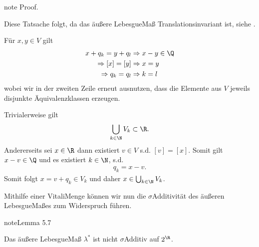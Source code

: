 \documentclass[letterpaper,10pt,english]{jupyterBook}
\begin{document}
\begin{sphinxadmonition}{note}
\sphinxAtStartPar
Proof. 

\sphinxAtStartPar
{}

\sphinxAtStartPar
Diese Tatsache folgt, da das äußere Lebesgue\sphinxhyphen{}Maß Translationsinvariant ist, siehe {\hyperref[\detokenize{masstheorie/masstheorie:rem:transinvariance}]{}}.

\sphinxAtStartPar
{}

\sphinxAtStartPar
Für \(x,y\in V\) gilt
\begin{equation*}
\begin{split}x + q_k = y + q_l&\Rightarrow x-y\in\Q\\
\Rightarrow [x]=[y]&\Rightarrow x=y\\
\Rightarrow q_k=q_l&\Rightarrow k=l\end{split}
\end{equation*}
\sphinxAtStartPar
wobei wir in der zweiten Zeile erneut ausnutzen, dass die Elemente aus \(V\) jeweils disjunkte Äquivalenzklassen erzeugen.

\sphinxAtStartPar
{}

\sphinxAtStartPar
Trivialerweise gilt
\begin{equation*}
\begin{split}\bigcup_{k\in\N} V_k \subset \R.\end{split}
\end{equation*}
\sphinxAtStartPar
Andererseits sei \(x\in\R\) dann existiert \(v\in V\) s.d. \([v] = [x]\). Somit gilt \(x-v\in\Q\) und es existiert \(k\in\N\), s.d.
\begin{equation*}
\begin{split}q_k = x-v.\end{split}
\end{equation*}
\sphinxAtStartPar
Somit folgt \(x=v+q_k\in V_k\) und daher \(x\in\bigcup_{k\in\N} V_k\).
\end{sphinxadmonition}

\sphinxAtStartPar
Mithilfe einer Vitali\sphinxhyphen{}Menge können wir nun die \(\sigma\)\sphinxhyphen{}Additivität des äußeren Lebesgue\sphinxhyphen{}Maßes zum Widerspruch führen.
\label{masstheorie/masstheorie:lemma-30}
\begin{sphinxadmonition}{note}{Lemma 5.7}



\sphinxAtStartPar
Das äußere Lebesgue\sphinxhyphen{}Maß \(\lambda^\ast\) ist nicht \(\sigma\)\sphinxhyphen{}Additiv auf \(2^{\R}\).
\end{sphinxadmonition}
\end{document}

